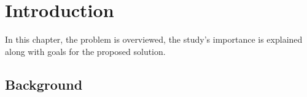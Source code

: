 \chapter{Introduction}\label{chap:intro}


In this chapter, the problem is overviewed, the study’s importance is explained along with goals for the proposed solution. 

\section{Background}

